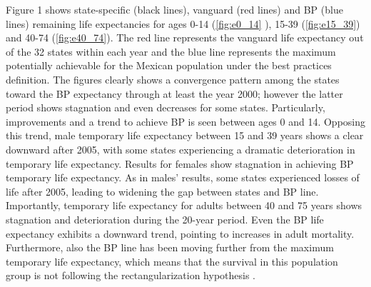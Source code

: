 \documentclass{article}
\begin{document}
Figure 1 shows state-specific  (black lines), vanguard  (red lines) and BP (blue lines) remaining life expectancies for ages 0-14 (\ref{fig:e0_14} ), 15-39
(\ref{fig:e15_39}) and 40-74 (\ref{fig:e40_74}). The red line represents the
vanguard life expectancy out of the 32 states within each year and the blue line
represents the maximum potentially achievable for the Mexican population under
the best practices definition.
The figures clearly shows a convergence pattern among the states toward the BP
expectancy through at least the year 2000; however the latter period shows
stagnation and even decreases for some states. Particularly, improvements and a trend to achieve BP is seen between ages 0 and 14. Opposing this trend, male temporary life expectancy between 15 and 39 years shows a clear downward after 2005, with some states experiencing a dramatic deterioration in temporary life expectancy. Results for females show stagnation in achieving BP temporary life expectancy. As in males' results, some states experienced losses of life after 2005, leading to widening the gap between states and BP line. 
Importantly, temporary life expectancy for adults between 40 and 75 years shows stagnation and deterioration during the 20-year period. Even the BP life expectancy exhibits a downward trend, pointing to increases in adult mortality. Furthermore, also the BP line has been moving further from the maximum temporary life expectancy, which means that the survival in this population group is not following the rectangularization hypothesis \citep{wilmoth1999}. 
\end{document}
